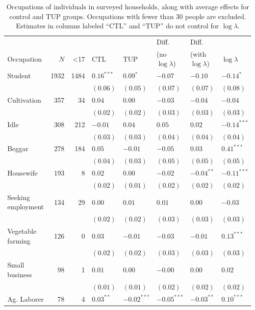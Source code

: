 \documentclass[12pt,letterpaper]{article}
\begin{document}
\begin{table}[htb]
\caption{\label{tab:orgtable5}
Occupations of individuals in surveyed households, along with average effects for control and TUP groups.  Occupations with fewer than 30 people are excluded.  Estimates in columns labeled ``CTL'' and ``TUP'' do not control for \(\log\lambda\).}
\centering
\begin{tabular}{lrrlllll}
 &  &  &  &  & Diff. & Diff. & \\
Occupation & \(N\) & <17 & CTL & TUP & (no \(\log\lambda\)) & (with \(\log\lambda\)) & \(\log\lambda\)\\
\hline
Student & 1932 & 1484 & \(0.16^{***}\) & \(0.09^{*}\) & \(-0.07\) & \(-0.10\) & \(-0.14^{*}\)\\
 &  &  & \((0.06)\) & \((0.05)\) & \((0.07)\) & \((0.07)\) & \((0.08)\)\\
Cultivation & 357 & 34 & \(0.04\) & \(0.00\) & \(-0.03\) & \(-0.04\) & \(-0.04\)\\
 &  &  & \((0.02)\) & \((0.02)\) & \((0.03)\) & \((0.03)\) & \((0.03)\)\\
Idle & 308 & 212 & \(-0.01\) & \(0.04\) & \(0.05\) & \(0.02\) & \(-0.14^{***}\)\\
 &  &  & \((0.03)\) & \((0.03)\) & \((0.04)\) & \((0.04)\) & \((0.04)\)\\
Beggar & 278 & 184 & \(0.05\) & \(-0.01\) & \(-0.05\) & \(0.03\) & \(0.41^{***}\)\\
 &  &  & \((0.04)\) & \((0.03)\) & \((0.05)\) & \((0.05)\) & \((0.05)\)\\
Housewife & 193 & 8 & \(0.02\) & \(0.00\) & \(-0.02\) & \(-0.04^{**}\) & \(-0.11^{***}\)\\
 &  &  & \((0.02)\) & \((0.01)\) & \((0.02)\) & \((0.02)\) & \((0.02)\)\\
Seeking employment & 134 & 29 & \(0.00\) & \(0.01\) & \(0.01\) & \(0.00\) & \(-0.03\)\\
 &  &  & \((0.02)\) & \((0.02)\) & \((0.03)\) & \((0.03)\) & \((0.03)\)\\
Vegetable farming & 126 & 0 & \(0.03\) & \(-0.01\) & \(-0.03\) & \(-0.01\) & \(0.13^{***}\)\\
 &  &  & \((0.02)\) & \((0.02)\) & \((0.03)\) & \((0.03)\) & \((0.03)\)\\
Small business & 98 & 1 & \(0.01\) & \(0.00\) & \(-0.00\) & \(0.00\) & \(0.02\)\\
 &  &  & \((0.01)\) & \((0.01)\) & \((0.02)\) & \((0.02)\) & \((0.02)\)\\
Ag. Laborer & 78 & 4 & \(0.03^{**}\) & \(-0.02^{***}\) & \(-0.05^{***}\) & \(-0.03^{**}\) & \(0.10^{***}\)\\

\end{tabular}
\end{table}
\end{document}
